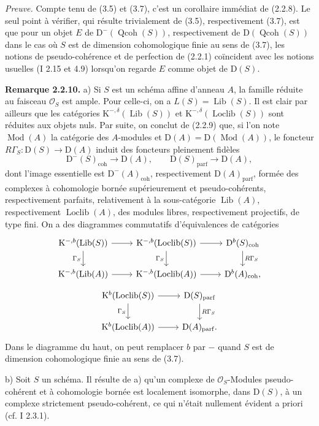 \documentclass[11pt]{article}
\providecommand{\Mod}{\operatorname{Mod}}
\providecommand{\Lib}{\operatorname{Lib}}
\providecommand{\Loclib}{\operatorname{Loclib}}
\providecommand{\Qcoh}{\operatorname{Qcoh}}
\providecommand{\coh}{\operatorname{coh}}
\providecommand{\parf}{\operatorname{parf}}
\begin{document}
\emph{Preuve.} Compte tenu de (3.5) et (3.7), c'est un corollaire immédiat de (2.2.8). Le seul point à vérifier, qui résulte trivialement de (3.5), respectivement (3.7), est que pour un objet $E$ de $\mathrm D^{-}(\Qcoh(S))$, respectivement de $\mathrm D(\Qcoh(S))$ dans le cas où $S$ est de dimension cohomologique finie au sens de (3.7), les notions de pseudo-cohérence et de perfection de (2.2.1) coïncident avec les notions usuelles (I 2.15 et 4.9) lorsqu'on regarde $E$ comme objet de $\mathrm D(S)$.

\textbf{Remarque 2.2.10.} a) Si $S$ est un schéma affine d'anneau $A$, la famille réduite au faisceau $\mathcal O_S$ est ample. Pour celle-ci, on a $L(S)=\Lib(S)$. Il est clair par ailleurs que les catégories $\mathrm K^{-,\delta}(\Lib(S))$ et $\mathrm K^{-,\delta}(\Loclib(S))$ sont réduites aux objets nuls. Par suite, on conclut de (2.2.9) que, si l'on note $\Mod(A)$ la catégorie des $A$-modules et $\mathrm D(A)=\mathrm D(\Mod(A))$, le foncteur $R\Gamma_S:\mathrm D(S)\to\mathrm D(A)$ induit des foncteurs pleinement fidèles
\[
\mathrm D^{-}(S)_{\coh}\longrightarrow\mathrm D(A),
\qquad
\mathrm D(S)_{\parf}\longrightarrow\mathrm D(A),
\]
dont l'image essentielle est $\mathrm D^{-}(A)_{\coh}$, respectivement $\mathrm D(A)_{\parf}$, formée des complexes à cohomologie bornée supérieurement et pseudo-cohérents, respectivement parfaits, relativement à la sous-catégorie $\Lib(A)$, respectivement $\Loclib(A)$, des modules libres, respectivement projectifs, de type fini. On a des diagrammes commutatifs d'équivalences de catégories
\[
\begin{tikzcd}
\mathrm K^{-,b}(\Lib(S)) \arrow[r] \arrow[d,"\Gamma_S"'] &
\mathrm K^{-,b}(\Loclib(S)) \arrow[r] \arrow[d,"\Gamma_S"'] &
\mathrm D^b(S)_{\coh} \arrow[d,"R\Gamma_S"] \\
\mathrm K^{-,b}(\Lib(A)) \arrow[r] &
\mathrm K^{-,b}(\Loclib(A)) \arrow[r] &
\mathrm D^b(A)_{\coh},
\end{tikzcd}
\]
\[
\begin{tikzcd}
\mathrm K^b(\Loclib(S)) \arrow[r] \arrow[d,"\Gamma_S"'] &
\mathrm D(S)_{\parf} \arrow[d,"R\Gamma_S"] \\
\mathrm K^b(\Loclib(A)) \arrow[r] &
\mathrm D(A)_{\parf}.
\end{tikzcd}
\]
Dans le diagramme du haut, on peut remplacer $b$ par $-$ quand $S$ est de dimension cohomologique finie au sens de (3.7).

b) Soit $S$ un schéma. Il résulte de a) qu'un complexe de $\mathcal O_S$-Modules pseudo-cohérent et à cohomologie bornée est localement isomorphe, dans $\mathrm D(S)$, à un complexe strictement pseudo-cohérent, ce qui n'était nullement évident a priori (cf. I 2.3.1).
\end{document}
